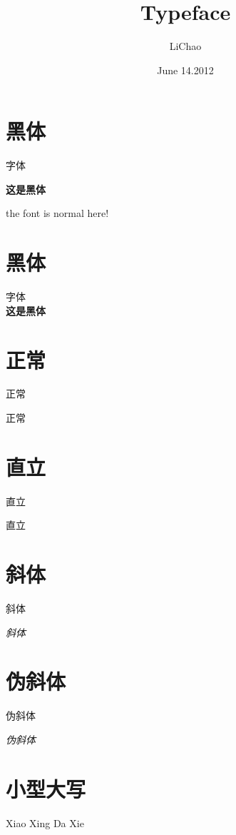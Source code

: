 \documentclass[UTF8]{ctexart}
\title{Typeface}
\author{LiChao}
\date{June 14.2012}
\begin{document}
\maketitle
\part {黑体}
字体

\textbf{这是黑体}

the font is normal here!

\vspace{1cm}

\part  {黑体}
字体\\
\textbf{这是黑体}

\vspace{1cm}

\part   {正常}
正常

\textmd{正常}

\vspace{3cm}

\part  {直立}
直立

\textup{直立}

\vspace{1cm}

\part  {斜体}
斜体

\textit{斜体}

\vspace{1cm}

\part  {伪斜体}
伪斜体

\textsl{伪斜体}

\vspace{1cm}

\part  {小型大写}
Xiao Xing Da Xie
\end{document}
